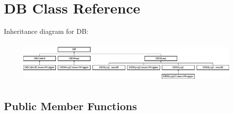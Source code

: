 \hypertarget{classDB}{\section{D\+B Class Reference}
\label{classDB}
}
Inheritance diagram for D\+B\+:\begin{figure}[H]
\begin{center}
\leavevmode
\includegraphics[height=2.183236cm]{classDB}
\end{center}
\end{figure}
\subsection*{Public Member Functions}
